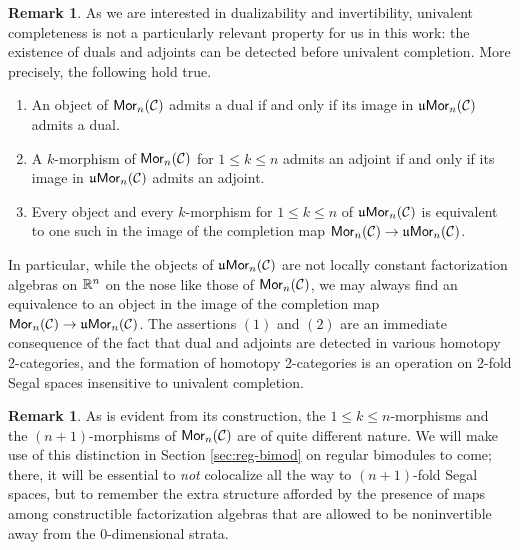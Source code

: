 \documentclass[10pt, reqno, twoside
, final
]{amsart}
\numberwithin{equation}{subsection}%
\theoremstyle{definition}
\theoremstyle{definition}
\theoremstyle{definition}
\theoremstyle{definition}
\theoremstyle{definition}
\theoremstyle{definition}
\theoremstyle{definition}
\theoremstyle{definition}
\theoremstyle{definition}
\theoremstyle{plain}
\theoremstyle{definition}
\theoremstyle{plain}
\theoremstyle{definition}
\theoremstyle{plain}
\theoremstyle{definition}
\newtheorem{rmk}[defn]{Remark}
\theoremstyle{definition}
\theoremstyle{plain}
\theoremstyle{plain}
\theoremstyle{definition}
\theoremstyle{plain}
\theoremstyle{plain}
\theoremstyle{plain}
\begin{document}
\begin{rmk}
As we are interested in dualizability and invertibility, univalent completeness is not a particularly relevant property for us in this work: the existence of duals and adjoints can be detected before univalent completion. More precisely, the following hold true.
\begin{enumerate}[$(1)$]
    \item An object of $\mathsf{Mor}_n(\mathcal{C})$ admits a dual if and only if its image in $\mathfrak{u}\mathsf{Mor}_n(\mathcal{C})$ admits a dual.
    \item A $k$-morphism of $\mathsf{Mor}_n(\mathcal{C})$ for $1\leq k\leq n$ admits an adjoint if and only if its image in $\mathfrak{u}\mathsf{Mor}_n(\mathcal{C})$ admits an adjoint.
    \item Every object and every $k$-morphism for $1\leq k\leq n$ of $\mathfrak{u}\mathsf{Mor}_n(\mathcal{C})$ is equivalent to one such in the image of the completion map $\mathsf{Mor}_n(\mathcal{C})\rightarrow \mathfrak{u}\mathsf{Mor}_n(\mathcal{C})$.
\end{enumerate}
In particular, while the objects of $\mathfrak{u}\mathsf{Mor}_n(\mathcal{C})$ are not locally constant factorization algebras on $\mathbb{R}^n$ on the nose like those of $\mathsf{Mor}_n(\mathcal{C})$, we may always find an equivalence to an object in the image of the completion map $\mathsf{Mor}_n(\mathcal{C})\rightarrow \mathfrak{u}\mathsf{Mor}_n(\mathcal{C})$. The assertions $(1)$ and $(2)$ are an immediate consequence of the fact that dual and adjoints are detected in various homotopy 2-categories, and the formation of homotopy 2-categories is an operation on 2-fold Segal spaces insensitive to univalent completion.
\end{rmk}

\begin{rmk}
As is evident from its construction, the $1\leq k\leq n$-morphisms and the $(n+1)$-morphisms of $\mathsf{Mor}_n(\mathcal{C})$ are of quite different nature. We will make use of this distinction in Section \ref{sec:reg-bimod} on regular bimodules to come; there, it will be essential to \emph{not} colocalize all the way to $(n+1)$-fold Segal spaces, but to remember the extra structure afforded by the presence of maps among constructible factorization algebras that are allowed to be noninvertible away from the 0-dimensional strata. 
\end{rmk}
\end{document}
